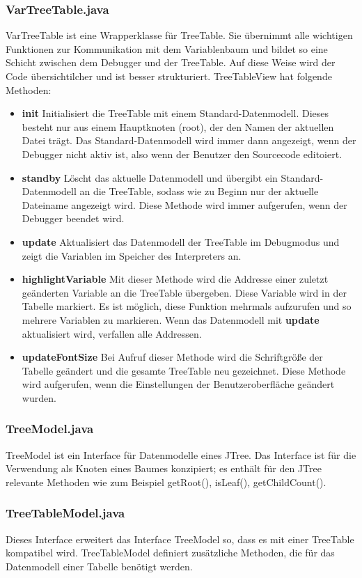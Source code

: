 \subsubsection*{VarTreeTable.java}
VarTreeTable ist eine Wrapperklasse für TreeTable. Sie übernimmt alle wichtigen Funktionen zur Kommunikation mit dem Variablenbaum und bildet so eine Schicht zwischen dem Debugger und der TreeTable. Auf diese Weise wird der Code übersichtilcher und ist besser strukturiert.
TreeTableView hat folgende Methoden:
\begin{itemize}
\item \textbf{init} Initialisiert die TreeTable mit einem Standard-Datenmodell. Dieses besteht nur aus einem Hauptknoten (root), der den Namen der aktuellen Datei trägt. Das Standard-Datenmodell wird immer dann angezeigt, wenn der Debugger nicht aktiv ist, also wenn der Benutzer den Sourcecode editoiert.
\item \textbf{standby} Löscht das aktuelle Datenmodell und übergibt ein Standard-Datenmodell an die TreeTable, sodass wie zu Beginn nur der aktuelle Dateiname angezeigt wird. Diese Methode wird immer aufgerufen, wenn der Debugger beendet wird.
\item \textbf{update} Aktualisiert das Datenmodell der TreeTable im Debugmodus und zeigt die Variablen im Speicher des Interpreters an.
\item \textbf{highlightVariable} Mit dieser Methode wird die Addresse einer zuletzt geänderten Variable an die TreeTable übergeben. Diese Variable wird in der Tabelle markiert. Es ist möglich, diese Funktion mehrmals aufzurufen und so mehrere Variablen zu markieren. Wenn das Datenmodell mit \textbf{update} aktualisiert wird, verfallen alle Addressen.
\item \textbf{updateFontSize} Bei Aufruf dieser Methode wird die Schriftgröße der Tabelle geändert und die gesamte TreeTable neu gezeichnet. Diese Methode wird aufgerufen, wenn die Einstellungen der Benutzeroberfläche geändert wurden.
\end{itemize}

\subsubsection*{TreeModel.java}
TreeModel ist ein Interface für Datenmodelle eines JTree. Das Interface ist für die Verwendung als Knoten eines Baumes konzipiert; es enthält für den JTree relevante Methoden wie zum Beispiel getRoot(), isLeaf(), getChildCount().

\subsubsection*{TreeTableModel.java}
Dieses Interface erweitert das Interface TreeModel so, dass es mit einer TreeTable kompatibel wird. TreeTableModel definiert zusätzliche Methoden, die für das Datenmodell einer Tabelle benötigt werden.

